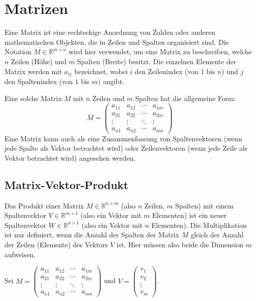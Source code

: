 \chapter{Matrizen}

Eine Matrix ist eine rechteckige Anordnung von Zahlen oder anderen mathematischen Objekten, die in Zeilen und Spalten organisiert sind. Die Notation $M \in \mathbb{R}^{m \times n}$ wird hier verwendet, um eine Matrix zu beschreiben, welche $n$ Zeilen (Höhe) und $m$ Spalten (Breite) besitzt. Die einzelnen Elemente der Matrix werden mit $a_{ij}$ bezeichnet, wobei $i$ den Zeilenindex (von $1$ bis $n$) und $j$ den Spaltenindex (von $1$ bis $m$) angibt.

Eine solche Matrix $M$ mit $n$ Zeilen und $m$ Spalten hat die allgemeine Form:
\[
   M = \begin{pmatrix}
   a_{11} & a_{12} & \cdots & a_{1m} \\
   a_{21} & a_{22} & \cdots & a_{2m} \\
   \vdots & \vdots & \ddots & \vdots \\
   a_{n1} & a_{n2} & \cdots & a_{nm}
   \end{pmatrix}
\]
Eine Matrix kann auch als eine Zusammenfassung von Spaltenvektoren (wenn jede Spalte als Vektor betrachtet wird) oder Zeilenvektoren (wenn jede Zeile als Vektor betrachtet wird) angesehen werden.

\section{Matrix-Vektor-Produkt}

Das Produkt einer Matrix $M \in \mathbb{R}^{n \times m}$ (also $n$ Zeilen, $m$ Spalten) mit einem Spaltenvektor $V \in \mathbb{R}^{m \times 1}$ (also ein Vektor mit $m$ Elementen) ist ein neuer Spaltenvektor $W \in \mathbb{R}^{n \times 1}$ (also ein Vektor mit $n$ Elementen).
Die Multiplikation ist nur definiert, wenn die Anzahl der Spalten der Matrix $M$ gleich der Anzahl der Zeilen (Elemente) des Vektors $V$ ist. Hier müssen also beide die Dimension $m$ aufweisen.

Sei $M = \begin{pmatrix}
a_{11} & a_{12} & \cdots & a_{1m} \\
a_{21} & a_{22} & \cdots & a_{2m} \\
\vdots & \vdots & \ddots & \vdots \\
a_{n1} & a_{n2} & \cdots & a_{nm}
\end{pmatrix}$ und $V = \begin{pmatrix} v_1 \\ v_2 \\ \vdots \\ v_m \end{pmatrix}$.

